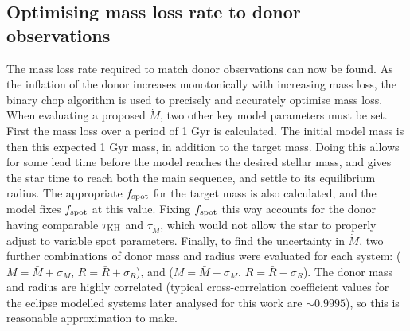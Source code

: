 \subsection{Optimising mass loss rate to donor observations}
\label{sect:modelling:optimising mass loss rate to observations}

The mass loss rate required to match donor observations can now be found. As the inflation of the donor increases monotonically with increasing mass loss, the binary chop algorithm is used to precisely and accurately optimise mass loss.
When evaluating a proposed $\dot M$, two other key model parameters must be set. First the mass loss over a period of 1 Gyr is calculated. The initial model mass is then this expected 1 Gyr mass, in addition to the target mass. Doing this allows for some lead time before the model reaches the desired stellar mass, and gives the star time to reach both the main sequence, and settle to its equilibrium radius.
The appropriate $f_{\rm spot}$ for the target mass is also calculated, and the model fixes $f_{\rm spot}$ at this value. Fixing $f_{\rm spot}$ this way accounts for the donor having comparable $\tau_{\rm KH}$ and $\tau_{\dot M}$, which would not allow the star to properly adjust to variable spot parameters.
Finally, to find the uncertainty in $\dot M$, two further combinations of donor mass and radius were evaluated for each system: ($M = \bar M + \sigma_M$, $R = \bar R + \sigma_R$), and ($M = \bar M - \sigma_M$, $R = \bar R - \sigma_R$). The donor mass and radius are highly correlated (typical cross-correlation coefficient values for the eclipse modelled systems later analysed for this work are $\sim 0.9995$), so this is reasonable approximation to make.




